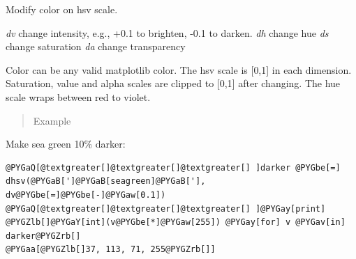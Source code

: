 \documentclass[letterpaper,10pt,english]{sphinxmanual}
\begin{document}

\begin{fulllineitems}
\label{api/util:refl1d.util.auto_shift}
\end{fulllineitems}


\begin{fulllineitems}
\label{api/util:refl1d.util.next_color}
\end{fulllineitems}


\begin{fulllineitems}
\label{api/util:refl1d.util.coordinated_colors}
\end{fulllineitems}


\begin{fulllineitems}
\label{api/util:refl1d.util.dhsv}
Modify color on hsv scale.

\emph{dv} change intensity, e.g., +0.1 to brighten, -0.1 to darken.
\emph{dh} change hue
\emph{ds} change saturation
\emph{da} change transparency

Color can be any valid matplotlib color.  The hsv scale is {[}0,1{]} in
each dimension.  Saturation, value and alpha scales are clipped to {[}0,1{]}
after changing.  The hue scale wraps between red to violet.
\begin{quote}\begin{description}
\item[{Example }] \leavevmode
\end{description}\end{quote}

Make sea green 10\% darker:

\begin{Verbatim}[commandchars=@\[\]]
@PYGaQ[@textgreater[]@textgreater[]@textgreater[] ]darker @PYGbe[=] dhsv(@PYGaB[']@PYGaB[seagreen]@PYGaB['], dv@PYGbe[=]@PYGbe[-]@PYGaw[0.1])
@PYGaQ[@textgreater[]@textgreater[]@textgreater[] ]@PYGay[print] @PYGZlb[]@PYGaY[int](v@PYGbe[*]@PYGaw[255]) @PYGay[for] v @PYGav[in] darker@PYGZrb[]
@PYGaa[@PYGZlb[]37, 113, 71, 255@PYGZrb[]]
\end{Verbatim}

\end{fulllineitems}
\end{document}
